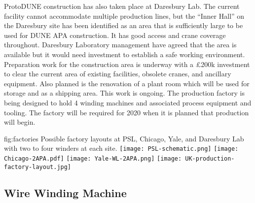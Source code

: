 

ProtoDUNE construction has also taken place at Daresbury Lab.  The current facility cannot accommodate multiple production lines, but the ``Inner Hall'' on the Daresbury site has been identified as an area that is sufficiently large to be used for DUNE APA construction. It has good access and crane coverage throughout. %
Daresbury Laboratory management have agreed that the area is available but it would need investment to establish a safe working environment. Preparation work for the construction area is underway with a \pounds200k investment to clear the current area of existing facilities, obsolete cranes, and ancillary equipment. Also planned is the renovation of a plant room which will be used for storage and as a shipping area. %
This work is ongoing. The production factory is being designed to hold 4 winding machines and associated process equipment and tooling. The factory will be required for 2020 when it is planned that production will begin. 

\begin{dunefigure}{fig:factories}
{Possible factory layouts at PSL, Chicago, Yale, and Daresbury Lab with two to four winders at each site.}
\texttt{[image: PSL-schematic.png]} 
\texttt{[image: Chicago-2APA.pdf]}
\texttt{[image: Yale-WL-2APA.png]}
\texttt{[image: UK-production-factory-layout.jpg]} 
\end{dunefigure}


\subsection{Wire Winding Machine}
\label{sec:fdsp-apa-winding}

